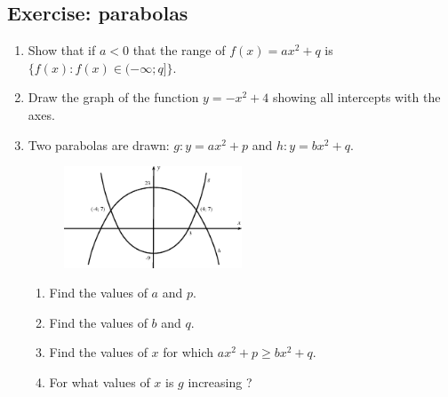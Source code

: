 \subsection*{Exercise:  parabolas }
\nopagebreak
\begin{enumerate}[noitemsep, label=\textbf{\arabic*}. ] 
\item Show that if $a<0$ that the range of $f(x)=a{x}^{2}+q$ is $\{f(x):f(x)\in (-\infty ;q]\}$.
\item Draw the graph of the function $y=-{x}^{2}+4$ showing all intercepts with the axes.
\item Two parabolas are drawn: $g:y=a{x}^{2}+p$ and $h:y=b{x}^{2}+q$.
\setcounter{subfigure}{0}
\begin{figure}[H] %
\begin{center}
\label{m39345*id245918!!!underscore!!!media}\label{m39345*id245918!!!underscore!!!printimage}\includegraphics[width=200px]{col11306.imgs/m39345_MG10C11_020.png} %
\vspace{2pt}
\vspace{.1in}
\end{center}
\end{figure}       
\begin{enumerate}[noitemsep, label=\textbf{\alph*}. ] 
\item Find the values of $a$ and $p$.
\item Find the values of $b$ and $q$.
\item Find the values of $x$ for which $a{x}^{2}+p\ge b{x}^{2}+q$.
\item For what values of $x$ is $g$ increasing ?
\end{enumerate}
  \end{enumerate}

